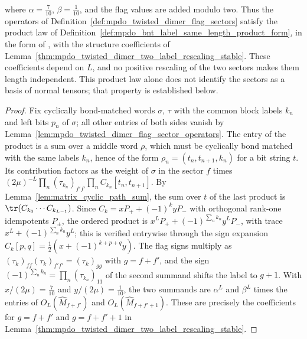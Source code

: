 \begin{lemma}
\begin{center}
\begin{tenkz}[rows={op}, cols=4, boundary=periodic]
        \end{tenkz}
    \end{center}
    where $\alpha=\frac{7}{10}$, $\beta=\frac1{10}$, and the flag values are
    added modulo two. Thus the operators of
    Definition~\ref{def:mpdo_twisted_dimer_flag_sectors} satisfy the
    product law of
    Definition~\ref{def:mpdo_bnt_label_same_length_product_form}, in the form
    of \cite[Theorem~4.14(ii), lines~972--985]{Cirac2016MPDO_arXiv}, with the
    structure coefficients of
    Lemma~\ref{thm:mpdo_twisted_dimer_two_label_rescaling_stable}.
    These coefficients depend on $L$, and no positive rescaling of the two
    sectors makes them length independent. This product law alone does not
    identify the sectors as a basis of normal tensors; that property is
    established below.
\end{lemma}
\begin{proof}\leanok
    Fix cyclically bond-matched words $\sigma$, $\tau$ with the common block
    labels $k_n$ and left bits $p_n$ of $\sigma$; all other entries of both
    sides vanish by Lemma~\ref{lem:mpdo_twisted_dimer_flag_sector_operators}.
    The entry of the product is a sum over a middle word $\rho$, which must be
    cyclically bond matched with the same labels $k_n$, hence of the form
    $\rho_n=(t_n,t_{n+1},k_n)$ for a bit string $t$. Its contribution factors
    as the weight of $\sigma$ in the sector $f$ times
    $(2\mu)^{-L}\prod_n(\tau_{k_n})_{f'f'}\prod_n C_{k_n}[t_n,t_{n+1}]$.
    By Lemma~\ref{lem:matrix_cyclic_path_sum}, the sum over $t$ of the last
    product is $\tr(C_{k_0}\cdots C_{k_{L-1}})$. Since
    $C_k=xP_++(-1)^kyP_-$ with orthogonal rank-one idempotents $P_\pm$, the
    ordered product is $x^LP_++(-1)^{\sum_n k_n}y^LP_-$, with trace
    $x^L+(-1)^{\sum_n k_n}y^L$; this is verified entrywise through the sign
    expansion $C_k[p,q]=\frac12(x+(-1)^{k+p+q}y)$. The flag signs multiply
    as $(\tau_k)_{ff}(\tau_k)_{f'f'}=(\tau_k)_{gg}$ with $g=f+f'$, and the
    sign $(-1)^{\sum_n k_n}=\prod_n(\tau_{k_n})_{11}$ of the second summand
    shifts the label to $g+1$. With $x/(2\mu)=\frac{7}{10}$ and
    $y/(2\mu)=\frac1{10}$, the two summands are $\alpha^L$ and $\beta^L$ times
    the entries of $O_L(\widehat M_{f+f'})$ and $O_L(\widehat M_{f+f'+1})$.
    These are precisely the coefficients for $g=f+f'$ and $g=f+f'+1$ in
    Lemma~\ref{thm:mpdo_twisted_dimer_two_label_rescaling_stable}.
\end{proof}


